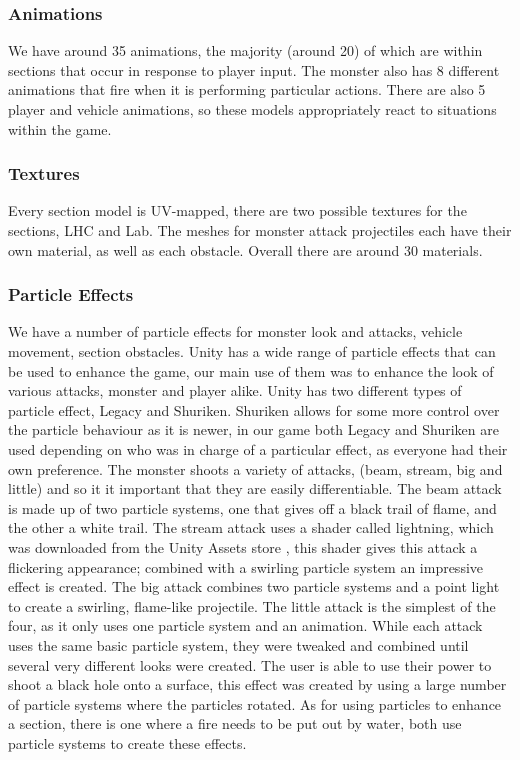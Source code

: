 \documentclass[a4paper,oneside]{memoir}
\begin{document}
            \subsubsection{Animations}
                We have around 35 animations, the majority (around 20) of which are within sections that occur in response to player input.
                The monster also has 8 different animations that fire when it is performing particular actions.
                There are also 5 player and vehicle animations, so these models appropriately react to situations within the game.
                
            \subsubsection{Textures}
                Every section model is UV-mapped, there are two possible textures for the sections, LHC and Lab.
                The meshes for monster attack projectiles each have their own material, as well as each obstacle.
                Overall there are around 30 materials.            
            
            \subsubsection{Particle Effects}
                We have a number of particle effects for monster look and attacks, vehicle movement, section obstacles.
                Unity has a wide range of particle effects that can be used to enhance the game, our main use of them was to enhance the look of various attacks, monster and player alike.
                Unity has two different types of particle effect, Legacy and Shuriken.
                Shuriken allows for some more control over the particle behaviour as it is newer, in our game both Legacy and Shuriken are used depending on who was in charge of a particular effect, as everyone had their own preference.
                The monster shoots a variety of attacks, (beam, stream, big and little) and so it it important that they are easily differentiable.
                The beam attack is made up of two particle systems, one that gives off a black trail of flame, and the other a white trail.
                The stream attack uses a shader called lightning, which was downloaded from the Unity Assets store \cite{Lightning}, this shader gives this attack a flickering appearance; combined with a swirling particle system an impressive effect is created.
                The big attack combines two particle systems and a point light to create a swirling, flame-like projectile.
                The little attack is the simplest of the four, as it only uses one particle system and an animation.
                While each attack uses the same basic particle system, they were tweaked and combined until several very different looks were created.
                The user is able to use their power to shoot a black hole onto a surface, this effect was created by using a large number of particle systems where the particles rotated.
                As for using particles to enhance a section, there is one where a fire needs to be put out by water, both use particle systems to create these effects.
            
\end{document}
